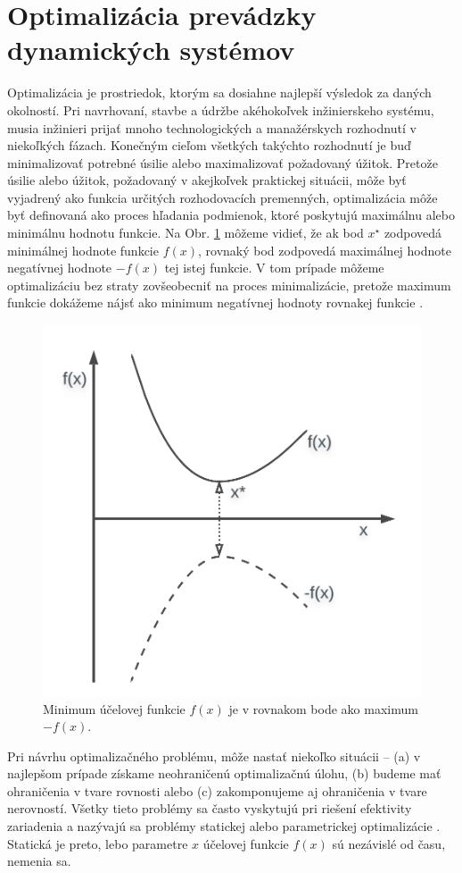 \section{Optimalizácia prevádzky dynamických systémov}
Optimalizácia je prostriedok, ktorým sa dosiahne najlepší výsledok za daných okolností. Pri navrhovaní, stavbe a údržbe akéhokoľvek inžinierskeho systému, musia inžinieri prijať mnoho technologických a manažérskych rozhodnutí v niekoľkých fázach. Konečným cieľom všetkých takýchto rozhodnutí je buď minimalizovať potrebné úsilie alebo maximalizovať požadovaný úžitok. Pretože úsilie alebo úžitok, požadovaný v akejkoľvek praktickej situácii, môže byť vyjadrený ako funkcia určitých rozhodovacích premenných, optimalizácia môže byť definovaná ako proces hľadania podmienok, ktoré poskytujú maximálnu alebo minimálnu hodnotu funkcie. Na Obr. \ref{fig:cost_fun_ex} môžeme vidieť, že ak bod $ x^{\star} $ zodpovedá minimálnej hodnote funkcie $ f(x) $, rovnaký bod zodpovedá maximálnej hodnote negatívnej hodnote $ -f(x) $ tej istej funkcie. V tom prípade môžeme optimalizáciu bez straty zovšeobecniť na proces minimalizácie, pretože maximum funkcie dokážeme nájsť ako minimum negatívnej hodnoty rovnakej funkcie \cite{rao:intro_engin_opt:2009}. 

\begin{figure}
	\centering
	\includegraphics[width=0.5\linewidth]{images/optimization_obj}
	\caption{Minimum účelovej funkcie $ f(x) $ je v rovnakom bode ako maximum $ -f(x) $.}
	\label{fig:cost_fun_ex}
\end{figure}

Pri návrhu optimalizačného problému, môže nastať niekoľko situácii -- (a) v najlepšom prípade získame neohraničenú optimalizačnú úlohu, (b) budeme mať ohraničenia v tvare rovnosti alebo (c) zakomponujeme aj ohraničenia v tvare nerovností. Všetky tieto problémy sa často vyskytujú pri riešení efektivity zariadenia a nazývajú sa problémy statickej alebo
parametrickej optimalizácie \cite{agrawal:static_opt:1999}. Statická je preto, lebo
parametre $ x $ účelovej funkcie $ f(x) $ sú nezávislé od času, nemenia sa. 

